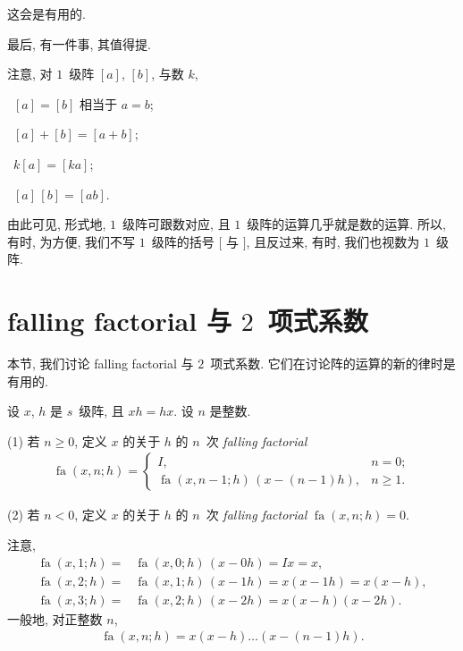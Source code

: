 \documentclass[../libro.tex]{subfiles}
\begin{document}
这会是有用的.

\vspace{2ex}

最后, 有一件事, 其值得提.

注意, 对 \(1\)~级阵 \([a]\), \([b]\), 与数 \(k\),

\textbullet\,
\([a] = [b]\) 相当于 \(a = b\);

\textbullet\,
\([a] + [b] = [a + b]\);

\textbullet\,
\(k [a] = [k a]\);

\textbullet\,
\([a]\, [b] = [a b]\).

由此可见, 形式地, \(1\)~级阵可跟数对应,
且 \(1\)~级阵的运算几乎就是数的运算.
所以, 有时, 为方便, 我们不写 \(1\)~级阵的括号 \([\) 与 \(]\),
且反过来, 有时, 我们也视数为 \(1\)~级阵.

\section{\texorpdfstring{falling factorial 与 \(2\)~项式系数}%
{falling factorial 与 2 项式系数}}

本节, 我们讨论 falling factorial 与 \(2\)~项式系数.
它们在讨论阵的运算的新的律时是有用的.

\begin{definition}
    设 \(x\), \(h\) 是 \(s\)~级阵,
    且 \(x h = h x\).
    设 \(n\) 是整数.

    (1)
    若 \(n \geq 0\), 定义
    \(x\) 的关于 \(h\) 的 \(n\)~次 \emph{falling factorial}
    \begin{align*}
        \operatorname{fa} {(x, n; h)} =
        \begin{cases}
            I, & n = 0; \\
            \operatorname{fa} {(x, n-1; h)}\, (x - (n-1) h), & n \geq 1.
        \end{cases}
    \end{align*}

    (2)
    若 \(n < 0\), 定义
    \(x\) 的关于 \(h\) 的 \(n\)~次 \emph{falling factorial}
    \(\operatorname{fa} {(x, n; h)} = 0\).
\end{definition}

注意,
\begin{align*}
    \operatorname{fa} {(x, 1; h)}
    = {} & \operatorname{fa} {(x, 0; h)}\, (x - 0 h)
    = I x = x,
    \\
    \operatorname{fa} {(x, 2; h)}
    = {} & \operatorname{fa} {(x, 1; h)}\, (x - 1 h)
    = x (x - 1 h) = x (x - h),
    \\
    \operatorname{fa} {(x, 3; h)}
    = {} & \operatorname{fa} {(x, 2; h)}\, (x - 2 h)
    = x (x - h) (x - 2 h).
\end{align*}
一般地, 对正整数 \(n\),
\begin{align*}
    \operatorname{fa} {(x, n; h)}
    = x (x - h) \dots (x - (n-1) h).
\end{align*}
\end{document}
